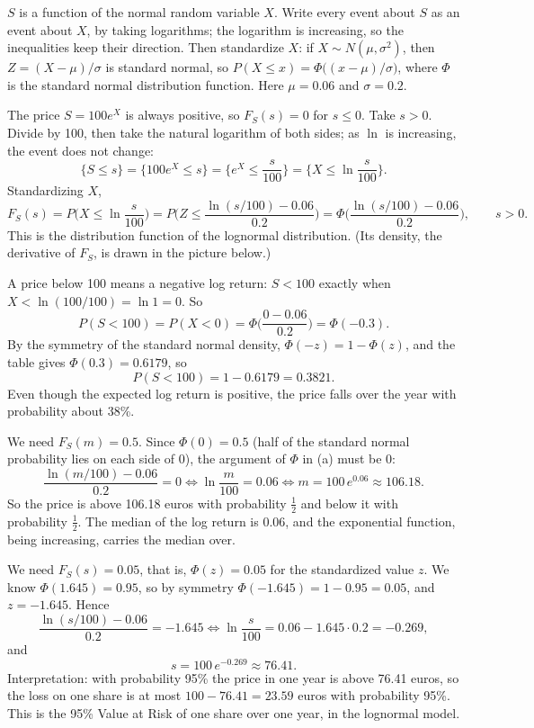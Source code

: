 \begin{solution}
	\idea $S$ is a function of the normal random variable $X$. Write every
	event about $S$ as an event about $X$, by taking logarithms; the logarithm
	is increasing, so the inequalities keep their direction. Then standardize
	$X$: if $X\sim N(\mu,\sigma^2)$, then $Z=(X-\mu)/\sigma$ is standard
	normal, so $P(X\le x)=\Phi\big((x-\mu)/\sigma\big)$, where $\Phi$ is the
	standard normal distribution function. Here $\mu=0.06$ and $\sigma=0.2$.

	 The price $S=100e^X$ is always positive, so $F_S(s)=0$ for
	$s\le0$. Take $s>0$. Divide by 100, then take the natural logarithm of
	both sides; as $\ln$ is increasing, the event does not change:
	\[ \{S\le s\}=\big\{100e^X\le s\big\}=\Big\{e^X\le\frac{s}{100}\Big\}
		=\Big\{X\le\ln\frac{s}{100}\Big\}. \]
	Standardizing $X$,
	\[ F_S(s)=P\Big(X\le\ln\frac{s}{100}\Big)
		=P\bigg(Z\le\frac{\ln(s/100)-0.06}{0.2}\bigg)
		=\Phi\bigg(\frac{\ln(s/100)-0.06}{0.2}\bigg),\qquad s>0. \]
	This is the distribution function of the lognormal distribution. (Its
	density, the derivative of $F_S$, is drawn in the picture below.)

	 A price below 100 means a negative log return: $S<100$ exactly
	when $X<\ln(100/100)=\ln1=0$. So
	\[ P(S<100)=P(X<0)=\Phi\Big(\frac{0-0.06}{0.2}\Big)=\Phi(-0.3). \]
	By the symmetry of the standard normal density, $\Phi(-z)=1-\Phi(z)$,
	and the table gives $\Phi(0.3)=0.6179$, so
	\[ P(S<100)=1-0.6179=0.3821. \]
	Even though the expected log return is positive, the price falls over
	the year with probability about 38\%.

	 We need $F_S(m)=0.5$. Since $\Phi(0)=0.5$ (half of the
	standard normal probability lies on each side of 0), the argument of
	$\Phi$ in (a) must be $0$:
	\[ \frac{\ln(m/100)-0.06}{0.2}=0\iff\ln\frac{m}{100}=0.06
		\iff m=100\,e^{0.06}\approx106.18. \]
	So the price is above 106.18 euros with probability $\frac12$ and below
	it with probability $\frac12$. The median of the log return is $0.06$,
	and the exponential function, being increasing, carries the median over.

	 We need $F_S(s)=0.05$, that is, $\Phi(z)=0.05$ for the
	standardized value $z$. We know $\Phi(1.645)=0.95$, so by symmetry
	$\Phi(-1.645)=1-0.95=0.05$, and $z=-1.645$. Hence
	\[ \frac{\ln(s/100)-0.06}{0.2}=-1.645\iff
		\ln\frac{s}{100}=0.06-1.645\cdot0.2=-0.269, \]
	and
	\[ s=100\,e^{-0.269}\approx76.41. \]
	Interpretation: with probability 95\% the price in one year is above
	76.41 euros, so the loss on one share is at most $100-76.41=23.59$ euros
	with probability 95\%. This is the 95\% Value at Risk of one share over
	one year, in the lognormal model.


\end{solution}
